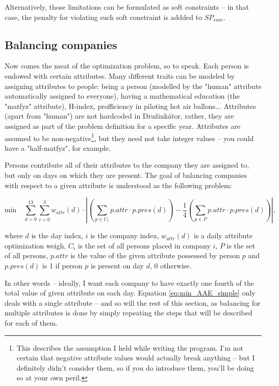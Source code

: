 \documentclass[11pt]{article}
\begin{document}
Alternatively, those limitations can be formulated as soft constraints -- in that case, the penalty for violating such soft constraint is addded to $SP_{sum}$.



\subsection{Balancing companies}

Now comes the meat of the optimization problem, so to speak.  Each person is endowed with certain attributes.  Many different traits can be modeled by
assigning attributes to people: being a person (modelled by the "human" attribute automatically assigned to everyone), having a mathematical education (the 
"matfyz" attribute), H-index, profficiency in piloting hot air ballons...  Attributes (apart from "human") are not hardcoded in Družinkátor, rather,
they are assigned as part of the problem definition for a specific year.  Attributes are assumed to be non-negative\footnote{This describes the assumption I 
held while writing the program.  I'm not certain that negative attribute values would actually break anything -- but I definitely didn't consider them, so
if you do introduce them, you'll be doing so at your own peril.}, but they need not take integer values -- you could have a "half-matfyz", for example.

Persons contribute all of their attributes to the company they are assigned to, but only on days on which they are present.  The goal of
balancing companies with respect to a given attribute is understood as the following problem:

\begin{equation}
\text{min} \quad  \sum_{d=0}^{13} \sum_{i=0}^3 w_{attr}(d)\cdot{}\left|(\sum_{p\in{C_i}}p.attr\cdot{}p.pres(d)) - \frac{1}{4}(\sum_{p\in{}P} p.attr\cdot{}p.pres(d))\right|,
\label{eq:min_AAE_simple}
\end{equation}

where $d$ is the day index, $i$ is the company index, $w_{attr}(d)$ is a daily attribute optimization weigh, $C_i$ is the set of all persons placed in company $i$,
$P$ is the set of all persons, $p.attr$ is the value of the given attribute possessed by person $p$ and $p.pres(d)$ is 1 if person $p$ is present on
day $d$, 0 otherwise.

In other words -- ideally, I want each company to have exactly one fourth of the total value of given attribute on each day.  Equation \ref{eq:min_AAE_simple} only
deals with a single attribute -- and so will the rest of this section, as balancing for multiple attributes is done by simply repeating the steps that will
be described for each of them.
\end{document}
